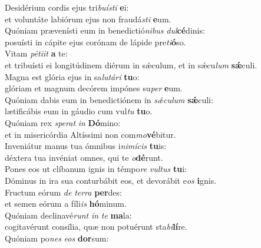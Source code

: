 \evenverse Desidérium cordis ejus tri\textit{bu}\textit{í}\textit{sti} \textbf{e}i:~\*\\
\evenverse et voluntáte labiórum ejus non fraudá\textit{sti} \textbf{e}um.\\
\oddverse Quóniam prævenísti eum in benedictió\textit{ni}\textit{bus} \textit{dul}\textbf{cé}dinis:~\*\\
\oddverse posuísti in cápite ejus corónam de lápide pre\textit{ti}\textbf{ó}so.\\
\evenverse Vitam \textit{pé}\textit{ti}\textit{it} \textbf{a} te:~\*\\
\evenverse et tribuísti ei longitúdinem diérum in sǽculum, et in sǽcu\textit{lum} \textbf{sǽ}culi.\\
\oddverse Magna est glória ejus in sa\textit{lu}\textit{tá}\textit{ri} \textbf{tu}o:~\*\\
\oddverse glóriam et magnum decórem impónes su\textit{per} \textbf{e}um.\\
\evenverse Quóniam dabis eum in benedictiónem in \textit{sǽ}\textit{cu}\textit{lum} \textbf{sǽ}culi:~\*\\
\evenverse lætificábis eum in gáudio cum vul\textit{tu} \textbf{tu}o.\\
\oddverse Quóniam rex \textit{spe}\textit{rat} \textit{in} \textbf{Dó}mino:~\*\\
\oddverse et in misericórdia Altíssimi non com\textit{mo}\textbf{vé}bitur.\\
\evenverse Inveniátur manus tua ómnibus i\textit{ni}\textit{mí}\textit{cis} \textbf{tu}is:~\*\\
\evenverse déxtera tua invéniat omnes, qui te \textit{o}\textbf{dé}runt.\\
\oddverse Pones eos ut clíbanum ignis in témpo\textit{re} \textit{vul}\textit{tus} \textbf{tu}i:~\*\\
\oddverse Dóminus in ira sua conturbábit eos, et devorábit e\textit{os} \textbf{i}gnis.\\
\evenverse Fructum eórum \textit{de} \textit{ter}\textit{ra} \textbf{per}des:~\*\\
\evenverse et semen eórum a fíli\textit{is} \textbf{hó}minum.\\
\oddverse Quóniam declinavé\textit{runt} \textit{in} \textit{te} \textbf{ma}la:~\*\\
\oddverse cogitavérunt consília, quæ non potuérunt sta\textit{bi}\textbf{lí}re.\\
\evenverse Quóniam po\textit{nes} \textit{e}\textit{os} \textbf{dor}sum:~\*\\
